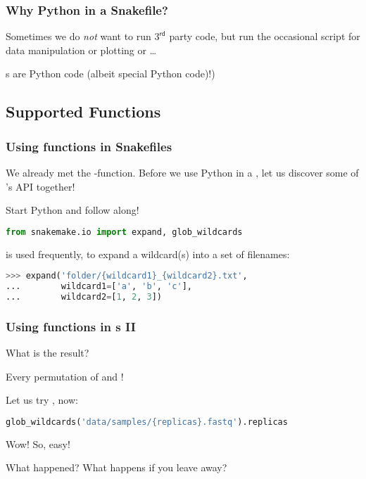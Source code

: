 \begin{frame}
  \frametitle{Why Python in a Snakefile?}
  Sometimes we do \emph{not} want to run $3^{\mathsf{rd}}$ party code, but run the occasional script for data manipulation   or plotting or \ldots 
  \pause
  \begin{docs}
  	s are Python code (albeit special Python code)!)
  \end{docs}
\end{frame}

\subsection{Supported Functions}

\begin{frame}[fragile]
  \frametitle{Using functions in Snakefiles}
  We already met the -function. Before we use Python in a , let us discover some of \Snakemake's API together!
  \begin{task}
  	Start Python and follow along!
  \end{task}
  \begin{lstlisting}[language=Python,style=Python]
from snakemake.io import expand, glob_wildcards
  \end{lstlisting}
    is used frequently, to expand a \Snakemake{} wildcard(s) into a set of filenames:
  \begin{lstlisting}[language=Python,style=Python]
>>> expand('folder/{wildcard1}_{wildcard2}.txt',
...        wildcard1=['a', 'b', 'c'],
...        wildcard2=[1, 2, 3])
  \end{lstlisting}
\end{frame}

\begin{frame}[fragile]
  \frametitle{Using functions in s II}
  \begin{question}
  	What is the result?
  \end{question}
  \pause
  \begin{hint}[Answer:]
  	Every permutation of  and !
  \end{hint}
  \pause
  Let us try , now:
  \begin{lstlisting}[language=Python,style=Python]
glob_wildcards('data/samples/{replicas}.fastq').replicas
  \end{lstlisting}
  \pause
  Wow! So, easy!
  \begin{question}
  	What happened? What happens if you leave  away?
  \end{question}
\end{frame}


